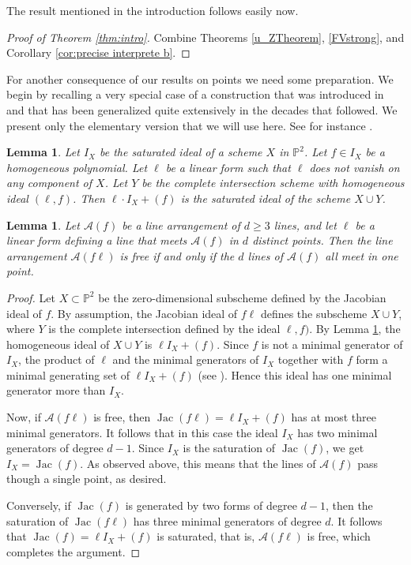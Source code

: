 \documentclass[12pt]{amsart}
\numberwithin{equation}{section}
\newtheorem{lemma}[theorem]{Lemma}
\theoremstyle{definition}
\begin{document}
The result mentioned in the introduction follows easily now. 

\begin{proof}[Proof of Theorem \ref{thm:intro}]
Combine Theorems \ref{u_ZTheorem}, \ref{FVstrong}, and Corollary \ref{cor:precise interprete b}. 
\end{proof}

For another consequence of our results on points we need some preparation. We begin by recalling 
a very special case of a construction that was introduced in \cite{LR} and that has been 
generalized quite extensively in the decades that followed. We present only the elementary 
version that we will use here. See for instance \cite{BM4}.

\begin{lemma} \label{BDL}
Let $I_X$ be the saturated ideal of a scheme $X$ in $\mathbb P^2$. Let $f \in I_X$ 
be a homogeneous polynomial. Let $\ell$ be a linear form such that $\ell$ does not 
vanish on any component of $X$. Let $Y$ be the complete intersection scheme 
with homogeneous ideal $(\ell,f)$. Then $\ell \cdot I_X + (f)$ is the saturated ideal of the scheme $X \cup Y$.
\end{lemma} 

\begin{lemma}
    \label{lem:non-free} 
Let ${\mathcal{A}} (f)$ be a line arrangement of $d \ge 3$ lines, and let $\ell$ be a linear form defining a line that meets ${\mathcal{A}} (f)$ in $d$ distinct points. Then the line arrangement ${\mathcal{A}} (f \ell)$ is free if and only if the $d$ lines of ${\mathcal{A}} (f)$ all meet in one point. 
\end{lemma}

\begin{proof}
Let $X \subset { \ensuremath{\mathbb{P}}}^2$ be the zero-dimensional subscheme defined by the Jacobian ideal of $f$. By assumption, the Jacobian ideal of $f \ell$ defines the subscheme $X \cup Y$, where $Y$ is the complete intersection defined by the ideal $\ell, f)$. By Lemma \ref{BDL}, the homogeneous ideal of $X \cup Y$ is $\ell I_X + (f)$. Since $f$ is not a minimal generator of $I_X$,  the product of $\ell$ and the minimal generators of $I_X$ together with $f$ form a minimal generating set of  $\ell I_X + (f)$ (see \cite[Corollary 4.5]{MN}). Hence this ideal has one minimal generator more than $I_X$. 

Now, if ${\mathcal{A}} (f \ell)$ is free, then $\operatorname{Jac} (f \ell) = \ell I_X + (f)$ has at most three minimal generators. It follows that in this case the ideal $I_X$ has two minimal generators of degree $d-1$. Since $I_X$ is the saturation of $\operatorname{Jac} (f)$, we get $I_X = \operatorname{Jac} (f)$. As observed above, this means that the lines of ${\mathcal{A}} (f)$ pass though a single point, as desired.  

Conversely, if $\operatorname{Jac} (f)$ is generated by two forms of degree $d-1$, then the saturation of $\operatorname{Jac} (f \ell)$ has three minimal generators of degree $d$. It follows that $\operatorname{Jac} (f) = \ell I_X + (f)$ is saturated, that is, ${\mathcal{A}} (f \ell)$ is free, which completes the argument. 
\end{proof}
\end{document}

